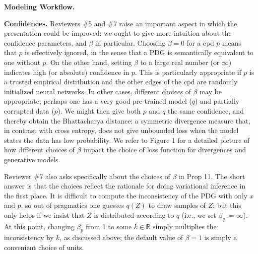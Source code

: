 \documentclass{article}
\theoremstyle{plain}
\theoremstyle{definition}
\begin{document}
\textbf{Modeling Workflow.}


\textbf{Confidences.}
Reviewers \#5 and \#7 raise an important aspect in which the presentation could be improved: we ought to give more intuition about the confidence parameters, and $\beta$ in particular.
Choosing $\beta=0$ for a cpd $p$ means that $p$ is effectively ignored, in the sense that a PDG is semantically equivalent to one without $p$.  On the other hand, setting $\beta$ to a large real number (or $\infty$) indicates high (or absolute) confidence in $p$.  This is particularly appropriate if $p$ is a trusted empirical distribution and the other edges of the cpd are randomly initialized neural networks.   In other cases, different choices of $\beta$ may be appropriate; perhaps one has a very good pre-trained model ($q$) and partially corrupted data ($p$).
We might then give both $p$ and $q$ the same confidence, and thereby obtain the Bhattacharya distance: a symmetric divergence measure that, in contrast with cross entropy, does not give unbounded loss when the model states the data has low probability.
We refer to Figure 1 for a detailed picture of how different choices of $\beta$
impact the choice of loss function for divergences and generative models.


Reviewer \#7 also asks specifically about the choices of $\beta$ in Prop 11. The short answer is that the choices reflect the rationale for doing variational inference in the first place. It is difficult to compute the inconsistency of the PDG with only $x$ and $p$, so out of pragmatics one guesses $q(Z)$ to draw samples of $Z$;  but this only helps if we insist that $Z$ is distributed according to $q$ (i.e., we set $\beta_q := \infty$). At this point, changing $\beta_p$ from 1 to some $k \in \mathbb R$ simply multiplies the inconsistency by $k$, as discussed above; the default value of $\beta=1$ is simply a convenient choice of units.
\end{document}
